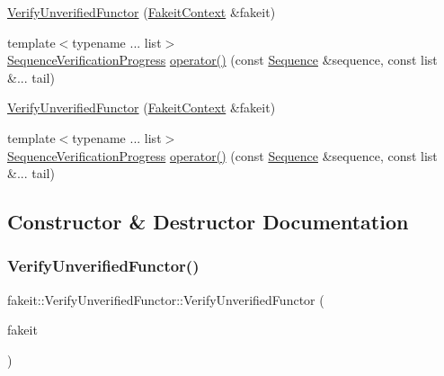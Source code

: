 \begin{DoxyCompactItemize}
\item 
\mbox{\hyperlink{classfakeit_1_1VerifyUnverifiedFunctor_adb55c8a4cdd929e88557f94d0b4fdf1e}{Verify\+Unverified\+Functor}} (\mbox{\hyperlink{structfakeit_1_1FakeitContext}{Fakeit\+Context}} \&fakeit)
\item 
{\footnotesize template$<$typename ... list$>$ }\\\mbox{\hyperlink{classfakeit_1_1SequenceVerificationProgress}{Sequence\+Verification\+Progress}} \mbox{\hyperlink{classfakeit_1_1VerifyUnverifiedFunctor_ac32fd9aaa7de99c3b6b89c39b642ecad}{operator()}} (const \mbox{\hyperlink{classfakeit_1_1Sequence}{Sequence}} \&sequence, const list \&... tail)
\item 
\mbox{\hyperlink{classfakeit_1_1VerifyUnverifiedFunctor_adb55c8a4cdd929e88557f94d0b4fdf1e}{Verify\+Unverified\+Functor}} (\mbox{\hyperlink{structfakeit_1_1FakeitContext}{Fakeit\+Context}} \&fakeit)
\item 
{\footnotesize template$<$typename ... list$>$ }\\\mbox{\hyperlink{classfakeit_1_1SequenceVerificationProgress}{Sequence\+Verification\+Progress}} \mbox{\hyperlink{classfakeit_1_1VerifyUnverifiedFunctor_ac32fd9aaa7de99c3b6b89c39b642ecad}{operator()}} (const \mbox{\hyperlink{classfakeit_1_1Sequence}{Sequence}} \&sequence, const list \&... tail)
\end{DoxyCompactItemize}


\subsection{Constructor \& Destructor Documentation}
\mbox{\label{classfakeit_1_1VerifyUnverifiedFunctor_adb55c8a4cdd929e88557f94d0b4fdf1e}} 
\subsubsection{\texorpdfstring{VerifyUnverifiedFunctor()}{VerifyUnverifiedFunctor()}\hspace{0.1cm}{\footnotesize\ttfamily [1/9]}}
{\footnotesize\ttfamily fakeit\+::\+Verify\+Unverified\+Functor\+::\+Verify\+Unverified\+Functor (\begin{DoxyParamCaption}\item[{\mbox{\hyperlink{structfakeit_1_1FakeitContext}{Fakeit\+Context}} \&}]{fakeit }\end{DoxyParamCaption})\hspace{0.3cm}{\ttfamily [inline]}}

